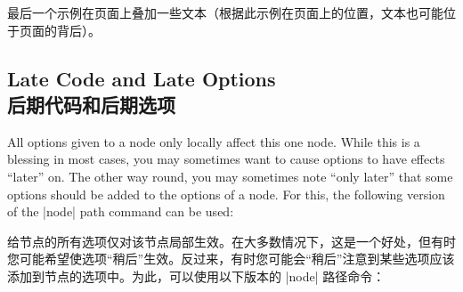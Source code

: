 最后一个示例在页面上叠加一些文本（根据此示例在页面上的位置，文本也可能位于页面的背后）。


\begin{codeexample}[]
\end{codeexample}


\subsection{Late Code and Late Options\\后期代码和后期选项}
\label{section-node-also}

All options given to a node only locally affect this one node. While this is a
blessing in most cases, you may sometimes want to cause options to have effects
``later'' on. The other way round, you may sometimes note ``only later'' that
some options should be added to the options of a node. For this, the following
version of the |node| path command can be used:

给节点的所有选项仅对该节点局部生效。在大多数情况下，这是一个好处，但有时您可能希望使选项“稍后”生效。反过来，有时您可能会“稍后”注意到某些选项应该添加到节点的选项中。为此，可以使用以下版本的 |node| 路径命令：

